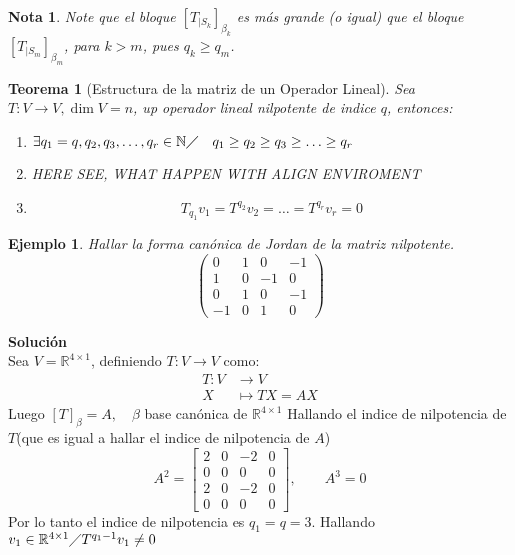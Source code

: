 \documentclass[10pt,a4paper]{article}
\newtheorem{mynote}{Nota}
\newtheorem{mytheo}{Teorema}
\newtheorem{myexamp}{Ejemplo}
\begin{document}
\begin{mynote}
Note que el bloque $\left[T_{|S_{k}}\right]_{\beta_{k}}$ es más grande (o igual) que el bloque $\left[T_{|S_{m}}\right]_{\beta_{m}}$, para $k > m$, pues $q_{k}\geq q_{m}$.

\end{mynote}


\begin{mytheo}[Estructura de la matriz de un Operador Lineal]
Sea $T:V\rightarrow V, \dim V = n$, up operador lineal nilpotente de indice $q$, entonces:
\begin{enumerate}
	\item $\exists q_{1} = q, q_{2}, q_{3},\ldots, q_{r}\in\mathbb{N}\diagup\quad q_{1}\geq q_{2}\geq q_{3}\geq\ldots\geq q_{r}$
	\item HERE SEE, WHAT HAPPEN WITH ALIGN ENVIROMENT
	\item
	$$T_{q_{1}} v_{1} = T^{q_{2}}v_{2} = \ldots = T^{q_{r}}v_{r} = 0$$
\end{enumerate}
\end{mytheo}

\begin{myexamp}
	Hallar la forma canónica de Jordan de la matriz nilpotente.
	$$\begin{pmatrix}
		0	&	1	&	0	&	-1\\
		1	&	0	&	-1	&	0\\
		0	&	1	&	0	&	-1\\
		-1	&	0	&	1	&	0
	\end{pmatrix}$$
\end{myexamp}
\textbf{Solución}\\
Sea $V = \mathbb{R}^{4\times 1}$, definiendo $T:V\rightarrow V$ como:
\begin{align*}
	T: V &\rightarrow V\\
	X &\mapsto TX = AX
\end{align*}
Luego $[T]_{\beta} = A, \quad\beta$ base canónica de $\mathbb{R}^{4\times 1}$
Hallando el indice de nilpotencia de $T$(que es igual a hallar el indice de nilpotencia de $A$)
$$A^{2} = 
\begin{bmatrix}
2	&	0	&	-2	&	0\\
0	&	0	&	0	&	0\\
2	&	0	&	-2	&	0\\
0	&	0	&	0	&	0
\end{bmatrix},\qquad
A^{3} = 0
$$
Por lo tanto el indice de nilpotencia es $q_{1} = q = 3$.
Hallando $v_{1}\in\mathbb{R}^{4\times 1}\diagup T^{q_{1}-1}v_{1}\neq 0$
\end{document}
